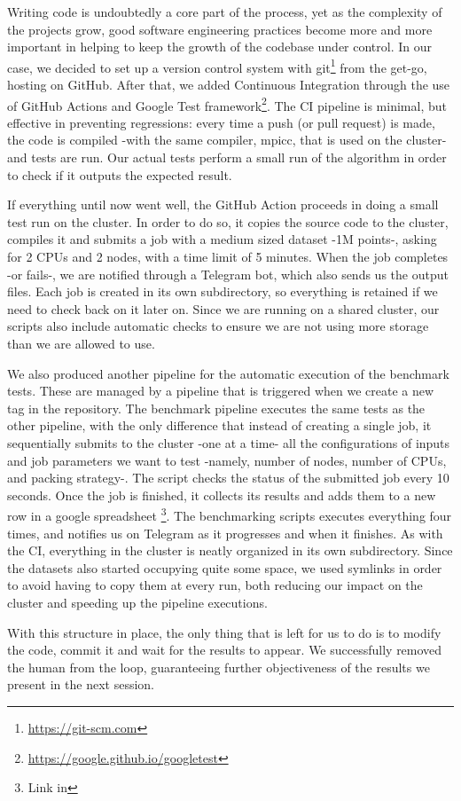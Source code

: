 Writing code is undoubtedly a core part of the process, yet as the complexity of the projects grow, good software engineering practices become more and more important in helping to keep the growth of the codebase under control.
In our case, we decided to set up a version control system with git\footnote{\url{https://git-scm.com}} from the get-go, hosting on GitHub. After that, we added Continuous Integration through the use of GitHub Actions and Google Test framework\footnote{\url{https://google.github.io/googletest}}. The CI pipeline is minimal, but effective in preventing regressions: every time a push (or pull request) is made, the code is compiled -with the same compiler, mpicc, that is used on the cluster- and tests are run. Our actual tests perform a small run of the algorithm in order to check if it outputs the expected result.

If everything until now went well, the GitHub Action proceeds in doing a small test run on the cluster. In order to do so, it copies the source code to the cluster, compiles it and submits a job with a medium sized dataset -1M points-, asking for 2 CPUs and 2 nodes, with a time limit of 5 minutes. When the job completes -or fails-, we are notified through a Telegram bot, which also sends us the output files. Each job is created in its own subdirectory, so everything is retained if we need to check back on it later on.
Since we are running on a shared cluster, our scripts also include automatic checks to ensure we are not using more storage than we are allowed to use.

We also produced another pipeline for the automatic execution of the benchmark tests. These are managed by a pipeline that is triggered when we create a new tag in the repository.
The benchmark pipeline executes the same tests as the other pipeline, with the only difference that instead of creating a single job, it sequentially submits to the cluster -one at a time- all the configurations of inputs and job parameters we want to test -namely, number of nodes, number of CPUs, and packing strategy-. The script checks the status of the submitted job every 10 seconds. Once the job is finished, it collects its results and adds them to a new row in a google spreadsheet
\footnote{Link in }.
The benchmarking scripts executes everything four times, and notifies us on Telegram as it progresses and when it finishes.
As with the CI, everything in the cluster is neatly organized in its own subdirectory.
Since the datasets also started occupying quite some space, we used symlinks in order to avoid having to copy them at every run, both reducing our impact on the cluster and speeding up the pipeline executions.

With this structure in place, the only thing that is left for us to do is to modify the code, commit it and wait for the results to appear. We successfully removed the human from the loop, guaranteeing further objectiveness of the results we present in the next session.
